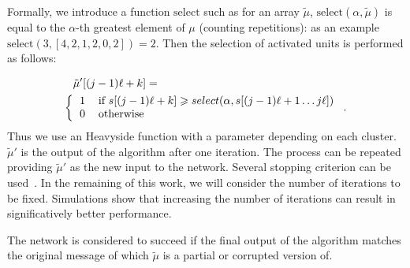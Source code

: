 \documentclass[english,10pt,twocolumn]{IEEEtran}
\renewcommand{\ge}{\geqslant}
\theoremstyle{definition}
\begin{document}
		
	Formally, we introduce a function $\mbox{select}$ such as for an array $\tilde{\mu}$, $\mbox{select}(\alpha, \tilde{\mu})$ is equal to the $\alpha$-th greatest element of $\mu$ (counting repetitions): as an example $\mbox{select}(3, [4,2,1,2,0,2]) = 2$. Then the selection of activated units is performed as follows:
		
		\begin{align*}
		&\tilde{\mu}'[(j-1)\ell+k] =\\ \bigg \{
  			&\begin{tabular}{cl}
  			$1$ & if $s[(j-1)\ell +k] \ge  \mbox{select}(\alpha, s[(j-1)\ell+1 \hdots j\ell])$ \\
  			$0$ & otherwise 
  		         \end{tabular}\;.
  		\end{align*}
                Thus we use an Heavyside function with a parameter depending on each cluster. $\tilde{\mu}'$ is the output of the algorithm after one iteration. The process can be repeated providing $\tilde{\mu}'$ as the new input to the network. Several stopping criterion can be used~\cite{Ala}. In the remaining of this work, we will consider the number of iterations to be fixed. Simulations show that increasing the number of iterations can result in significatively better performance.

The network is considered to succeed if the final output of the algorithm matches the original message of which $\tilde{\mu}$ is a partial or corrupted version of.
		
		
		
		
\end{document}

